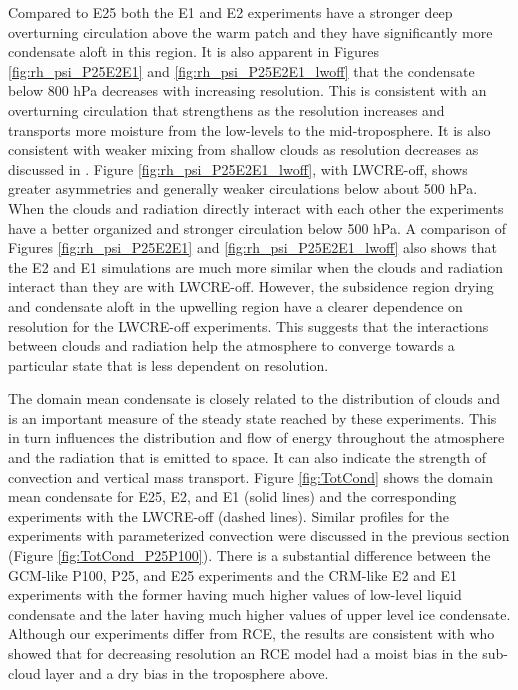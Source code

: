 \documentclass[draft]{agujournal2019}
\begin{document}
{Compared to E25 both the E1 and E2 experiments have a stronger deep overturning circulation above the warm 
patch and they have significantly more condensate aloft in this region.    It is also apparent in Figures 
\ref{fig:rh_psi_P25E2E1} and \ref{fig:rh_psi_P25E2E1_lwoff} that the condensate below 800 hPa 
decreases with increasing resolution.  
This is consistent with an overturning circulation that 
strengthens as the resolution increases and transports more moisture from the low-levels to the 
mid-troposphere.  It is also consistent with weaker mixing from shallow clouds as resolution decreases as
discussed in .   Figure \ref{fig:rh_psi_P25E2E1_lwoff}, with LWCRE-off, shows greater asymmetries 
and generally weaker circulations below about 500 hPa.  
When the clouds and radiation directly interact with each other the experiments have a better
organized and stronger circulation below 500 hPa.  A comparison of Figures \ref{fig:rh_psi_P25E2E1} and 
\ref{fig:rh_psi_P25E2E1_lwoff} also shows that the E2 and E1 simulations are much more 
similar when the clouds and radiation interact than they are with LWCRE-off.  However, the subsidence 
region drying and condensate aloft in the upwelling region have a clearer dependence on resolution for the
LWCRE-off experiments.  This suggests that the interactions between clouds and radiation help the 
atmosphere to converge towards a particular state that is less dependent on resolution.  
  
The domain mean condensate is closely related to the distribution of clouds and is an important measure of the 
steady state reached by these experiments.  This in turn influences 
the distribution and flow of energy throughout the atmosphere and the radiation that is emitted to space.  
It can also indicate the strength of convection and vertical mass transport.     
Figure \ref{fig:TotCond} shows the domain mean condensate for E25, E2, and E1
(solid lines) and the corresponding experiments with the LWCRE-off (dashed lines).  Similar profiles for the experiments
with parameterized convection were discussed in the previous section (Figure \ref{fig:TotCond_P25P100}).  
There is a substantial difference between the GCM-like P100, P25, and E25 experiments and the CRM-like E2 and E1 experiments 
with the former having much higher values of low-level liquid condensate and the later having much higher values of upper level ice condensate.  Although our experiments differ from RCE, the results are consistent with  who showed that for 
decreasing resolution an RCE model had a moist bias in the sub-cloud layer and a dry bias in the troposphere above.  

}
\end{document}
